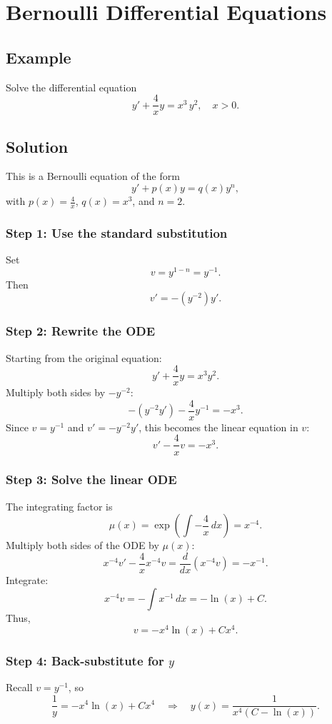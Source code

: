 \documentclass[12pt]{book}
\begin{document}
\section{Bernoulli Differential Equations}

\subsection*{Example}
Solve the differential equation
\[
y' + \frac{4}{x} y = x^3\,y^2, \quad x > 0.
\]

\subsection*{Solution}
This is a Bernoulli equation of the form
\[
y' + p(x)y = q(x)y^n,
\]
with \(p(x) = \frac{4}{x}\), \(q(x) = x^3\), and \(n = 2\).

\subsubsection*{Step 1: Use the standard substitution}
Set
\[
v = y^{1 - n} = y^{-1}.
\]
Then
\[
v' = -(y^{-2}) y'.
\]

\subsubsection*{Step 2: Rewrite the ODE}
Starting from the original equation:
\[
y' + \frac{4}{x} y = x^3 y^2.
\]
Multiply both sides by \(-y^{-2}\):
\[
-(y^{-2} y') - \frac{4}{x} y^{-1} = -x^3.
\]
Since \(v = y^{-1}\) and \(v' = -y^{-2}y'\), this becomes the linear equation in \(v\):
\[
v' - \frac{4}{x} v = -x^3.
\]

\subsubsection*{Step 3: Solve the linear ODE}
The integrating factor is
\[
\mu(x) = \exp\left( \int -\frac{4}{x} \,dx \right) = x^{-4}.
\]
Multiply both sides of the ODE by \(\mu(x)\):
\[
x^{-4} v' - \frac{4}{x} x^{-4} v = \frac{d}{dx}(x^{-4} v) = -x^{-1}.
\]
Integrate:
\[
x^{-4}v = -\int x^{-1}\,dx = -\ln(x) + C.
\]
Thus,
\[
v = -x^4 \ln(x) + C x^4.
\]

\subsubsection*{Step 4: Back-substitute for \(y\)}
Recall \(v = y^{-1}\), so
\[
\frac{1}{y} = -x^4 \ln(x) + C x^4
\quad\Longrightarrow\quad
y(x) = \frac{1}{x^4 (C - \ln(x))}.
\]
\end{document}
